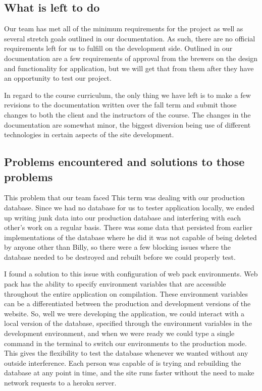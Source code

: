 \documentclass[draftclsnofoot,onecolumn,letterpaper,10pt,compsoc]{IEEEtran}
\begin{document}
\subsection{What is left to do}

Our team has met all of the minimum requirements for the project as well as several stretch goals outlined in our documentation.
As such, there are no official requirements left for us to fulfill on the development side.
Outlined in our documentation are a few requirements of approval from the brewers on the design and functionality for application, but we will get that from them after they have an opportunity to test our project.


In regard to the course curriculum, the only thing we have left is to make a few revisions to the documentation written over the fall term and submit those changes to both the client and the instructors of the course.
The changes in the documentation are somewhat minor, the biggest diversion being use of different technologies in certain aspects of the site development.



\subsection{Problems encountered and solutions to those problems}

This problem that our team faced This term was dealing with our production database.
Since we had no database for us to tester application locally, we ended up writing junk data into our production database and interfering with each other’s work on a regular basis.
There was some data that persisted from earlier implementations of the database where he did it was not capable of being deleted by anyone other than Billy, so there were a few blocking issues where the database needed to be destroyed and rebuilt before we could properly test.


I found a solution to this issue with configuration of web pack environments.
Web pack has the ability to specify environment variables that are accessible throughout the entire application on compilation.
These environment variables can be a differentiated between the production and development versions of the website.
So, well we were developing the application, we could interact with a local version of the database, specified through the environment variables in the development environment, and when we were ready we could type a single command in the terminal to switch our environments to the production mode.
This gives the flexibility to test the database whenever we wanted without any outside interference.
Each person was capable of is trying and rebuilding the database at any point in time, and the site runs faster without the need to make network requests to a heroku server.
\end{document}
